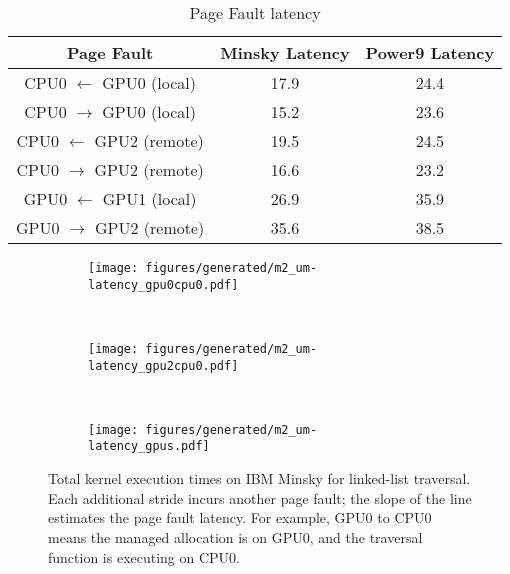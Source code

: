 \begin{table}[h]
	\centering
	\caption[]{Page Fault latency}
	\label{tab:page-fault-latency}
	\begin{tabular}{|c|c|c|}
		\hline
		\textbf{Page Fault} & \textbf{Minsky Latency} & \textbf{Power9 Latency} \\ \hline
		CPU0 $\leftarrow$ GPU0  (local) & 17.9 & 24.4   \\ \hline
        CPU0 $\rightarrow$ GPU0 (local) & 15.2 & 23.6  \\ \hline
        CPU0 $\leftarrow$ GPU2  (remote) & 19.5 & 24.5   \\ \hline
        CPU0 $\rightarrow$ GPU2 (remote) & 16.6 & 23.2  \\ \hline
        GPU0 $\leftarrow$ GPU1  (local) & 26.9 & 35.9   \\ \hline
		GPU0 $\rightarrow$ GPU2 (remote) & 35.6 & 38.5  \\ \hline
	\end{tabular}
\end{table}


\begin{figure}[ht]
    \centering
    \begin{subfigure}[b]{0.3\textwidth}
        \texttt{[image: figures/generated/m2\_um-latency\_gpu0cpu0.pdf]}
        \caption{}
        \label{}
    \end{subfigure}
    ~
    \begin{subfigure}[b]{0.3\textwidth}
        \texttt{[image: figures/generated/m2\_um-latency\_gpu2cpu0.pdf]}
        \caption{}
        \label{}
    \end{subfigure}
    ~
    \begin{subfigure}[b]{0.3\textwidth}
        \texttt{[image: figures/generated/m2\_um-latency\_gpus.pdf]}
        \caption{}
        \label{}
    \end{subfigure}
    \caption[]{ 
        Total kernel execution times on IBM Minsky for linked-list traversal.
        Each additional stride incurs another page fault; the slope of the line estimates the page fault latency.
        For example, GPU0 to CPU0 means the managed allocation is on GPU0, and the traversal function is executing on CPU0.
    }
    \label{fig:minsky-page-fault-latency}
\end{figure}


